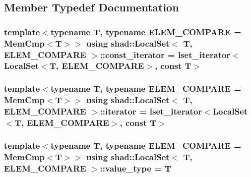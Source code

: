 \subsection{Member Typedef Documentation}
\hypertarget{classshad_1_1LocalSet_a3a1104a2552f91dcdf37b057440ba182}{
\subsubsection[{const\-\_\-iterator}]{\setlength{\rightskip}{0pt plus 5cm}template$<$typename T, typename E\-L\-E\-M\-\_\-\-C\-O\-M\-P\-A\-R\-E = Mem\-Cmp$<$\-T$>$$>$ using {\bf shad\-::\-Local\-Set}$<$ T, E\-L\-E\-M\-\_\-\-C\-O\-M\-P\-A\-R\-E $>$\-::{\bf const\-\_\-iterator} =  {\bf lset\-\_\-iterator}$<${\bf Local\-Set}$<$T, E\-L\-E\-M\-\_\-\-C\-O\-M\-P\-A\-R\-E$>$, const T$>$}}\label{classshad_1_1LocalSet_a3a1104a2552f91dcdf37b057440ba182}
\hypertarget{classshad_1_1LocalSet_a90ad05d816b6336fea56e6511093d4f6}{
\subsubsection[{iterator}]{\setlength{\rightskip}{0pt plus 5cm}template$<$typename T, typename E\-L\-E\-M\-\_\-\-C\-O\-M\-P\-A\-R\-E = Mem\-Cmp$<$\-T$>$$>$ using {\bf shad\-::\-Local\-Set}$<$ T, E\-L\-E\-M\-\_\-\-C\-O\-M\-P\-A\-R\-E $>$\-::{\bf iterator} =  {\bf lset\-\_\-iterator}$<${\bf Local\-Set}$<$T, E\-L\-E\-M\-\_\-\-C\-O\-M\-P\-A\-R\-E$>$, const T$>$}}\label{classshad_1_1LocalSet_a90ad05d816b6336fea56e6511093d4f6}
\hypertarget{classshad_1_1LocalSet_a2116351b475e6f8cb21f78f11486e9e7}{
\subsubsection[{value\-\_\-type}]{\setlength{\rightskip}{0pt plus 5cm}template$<$typename T, typename E\-L\-E\-M\-\_\-\-C\-O\-M\-P\-A\-R\-E = Mem\-Cmp$<$\-T$>$$>$ using {\bf shad\-::\-Local\-Set}$<$ T, E\-L\-E\-M\-\_\-\-C\-O\-M\-P\-A\-R\-E $>$\-::{\bf value\-\_\-type} =  T}}\label{classshad_1_1LocalSet_a2116351b475e6f8cb21f78f11486e9e7}


